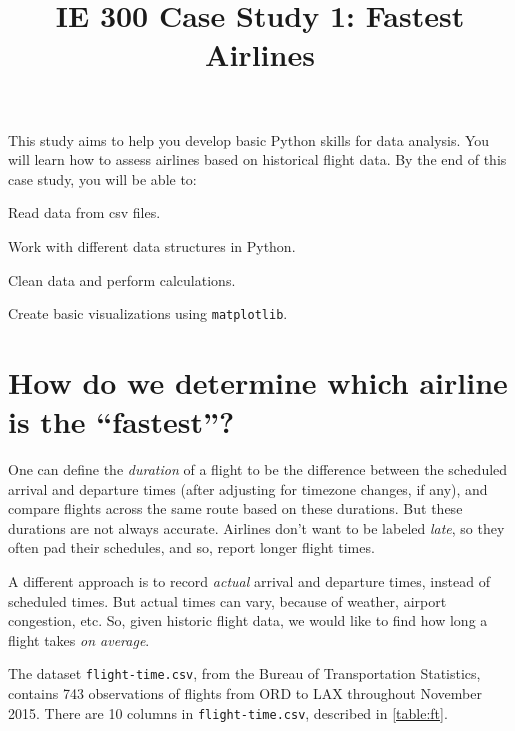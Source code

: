 \documentclass[11pt]{article}
\title{IE 300 Case Study 1: Fastest Airlines}
\author{\empty}
\date{\empty}
\begin{document}
\maketitle
\setlength{\parskip}{0.4em}


This study aims to help you develop basic Python skills for data analysis.
You will learn how to assess airlines based on historical flight data.
%
By the end of this case study, you will be able to:
\begin{tightemize}
\item Read data from csv files.
\item Work with different data structures in Python.
\item Clean data and perform calculations.
\item Create basic visualizations using \texttt{matplotlib}.
\end{tightemize}

\section{How do we determine which airline is the ``fastest''?}

One can define the \emph{duration} of a flight to be the difference between
the scheduled arrival and departure times (after adjusting for timezone changes, if any),
and compare flights across the same route based on these durations.
But these durations are not always accurate. Airlines don't want to be labeled \emph{late},
so they often pad their schedules, and so, report longer flight times.

A different approach is to record \emph{actual} arrival and departure times, instead of scheduled times.
But actual times can vary, because of weather, airport congestion, etc.
So, given historic flight data, we would like to find how long a flight takes \emph{on average}.

The dataset \texttt{flight-time.csv}, from the Bureau of Transportation Statistics,
contains 743 observations of flights from ORD to LAX throughout November 2015.
There are 10 columns in \texttt{flight-time.csv}, described in \cref{table:ft}.
\end{document}
